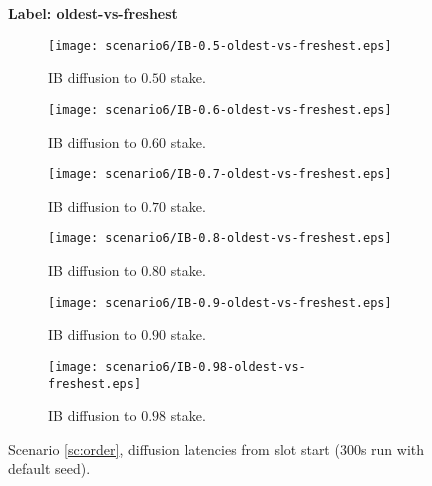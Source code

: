 \documentclass[11pt,a4paper]{article}
\newcommand{\debug}[1]{#1}
\begin{document}
\begin{figure}[htbp]
    \centering
    \debug{\textbf{Label: oldest-vs-freshest} \\}
    \begin{subfigure}[b]{0.45\textwidth}
        \centering
        \texttt{[image: scenario6/IB-0.5-oldest-vs-freshest.eps]}
        \caption{IB diffusion to $0.50$ stake.}
        \label{fig:oldest-vs-freshest:ib0.5}
    \end{subfigure}
    \hfill
    \begin{subfigure}[b]{0.45\textwidth}
        \centering
        \texttt{[image: scenario6/IB-0.6-oldest-vs-freshest.eps]}
        \caption{IB diffusion to $0.60$ stake.}
        \label{fig:oldest-vs-freshest:ib0.6}
    \end{subfigure}

    \vspace{1em}

    \begin{subfigure}[b]{0.45\textwidth}
        \centering
        \texttt{[image: scenario6/IB-0.7-oldest-vs-freshest.eps]}
        \caption{IB diffusion to $0.70$ stake.}
        \label{fig:oldest-vs-freshest:ib0.7}
    \end{subfigure}
    \hfill
    \begin{subfigure}[b]{0.45\textwidth}
        \centering
        \texttt{[image: scenario6/IB-0.8-oldest-vs-freshest.eps]}
        \caption{IB diffusion to $0.80$ stake.}
        \label{fig:oldest-vs-freshest:ib0.8}
    \end{subfigure}

    \vspace{1em}

    \begin{subfigure}[b]{0.45\textwidth}
        \centering
        \texttt{[image: scenario6/IB-0.9-oldest-vs-freshest.eps]}
        \caption{IB diffusion to $0.90$ stake.}
        \label{fig:oldest-vs-freshest:ib0.9}
    \end{subfigure}
    \hfill
    \begin{subfigure}[b]{0.45\textwidth}
        \centering
        \texttt{[image: scenario6/IB-0.98-oldest-vs-freshest.eps]}
        \caption{IB diffusion to $0.98$ stake.}
        \label{fig:oldest-vs-freshest:ib0.98}
    \end{subfigure}

    \caption{Scenario \ref{sc:order}, diffusion latencies from slot start (300s run with default seed).}
    \label{fig:oldest-vs-freshest}
\end{figure}
\end{document}
